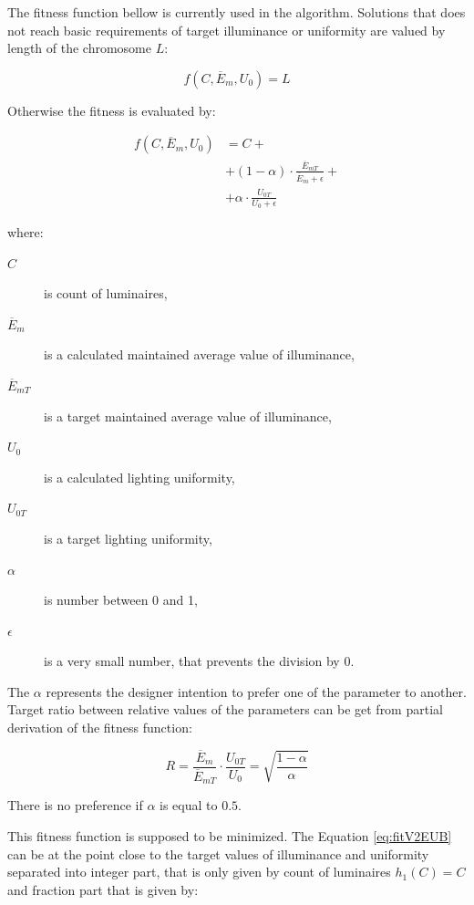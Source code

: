 The fitness function bellow is currently used in the algorithm. Solutions that does not reach basic requirements of target illuminance or uniformity are valued by length of the chromosome $L$:

\begin{equation}
\label{eq:fitV2EUA}
	f\left(C,\overline{E}_{m}, U_0\right)= L
\end{equation}

\noindent Otherwise the fitness is evaluated by:

\begin{equation}
\label{eq:fitV2EUB}
\begin{split}
f\left(C, \overline{E}_{m}, U_0\right)&=C +\\
& + \left( 1 - \alpha\right)\cdot\frac{\overline{E}_{mT}}{\overline{E}_{m}+\epsilon} + \\
& + \alpha\cdot\frac{U_{0T}}{U_0 + \epsilon}
\end{split}
\end{equation}

\noindent where:
\begin{description}
	\item[$C$] is count of luminaires,
	\item[$\overline{E}_{m}$] is a calculated maintained average value of illuminance,
	\item[$\overline{E}_{mT}$] is a target maintained average value of illuminance,
	\item[$U_0$] is a calculated lighting uniformity,
	\item[$U_{0T}$] is a target lighting uniformity,
	\item[$\alpha$] is number between 0 and 1,
	\item[$\epsilon$] is a very small number, that prevents the division by 0.
\end{description}

The $\alpha$ represents the designer intention to prefer one of the parameter to another. Target ratio between relative values of the parameters can be get from partial derivation of the fitness function:

\begin{equation}
\label{eq:fitV2ratio}
R =\frac{\overline{E}_{m}}{\overline{E}_{mT}}\cdot\frac{U_{0T}}{U_0}=\sqrt{\frac{1-\alpha}{\alpha}}
\end{equation}

\noindent There is no preference if $\alpha$ is equal to $0.5$.

This fitness function is supposed to be minimized. The Equation \ref{eq:fitV2EUB} can be at the point close to the target values of illuminance and uniformity separated into integer part, that is only given by count of luminaires $h_1\left(C\right)= C$ and fraction part that is given by:

